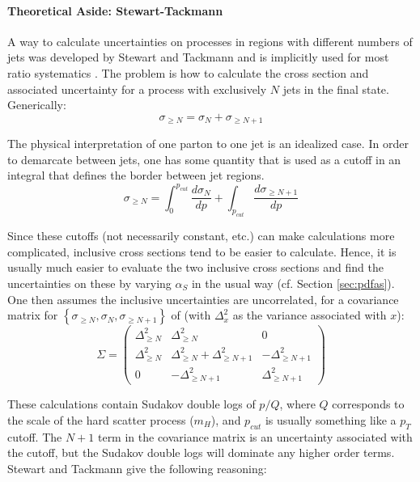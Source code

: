 \paragraph{Theoretical Aside: Stewart-Tackmann}
A way to calculate uncertainties on processes in regions with different numbers of jets was developed by Stewart and Tackmann and is implicitly used for most \nj\, ratio systematics \cite{stewarttackmann}.  The problem is how to calculate the cross section and associated uncertainty for a process with exclusively $N$ jets in the final state.  Generically:
\begin{equation}
\label{eqn:stewtack1}
\sigma_{\ge N}=\sigma_N+\sigma_{\ge N+1}
\end{equation}

The physical interpretation of one parton to one jet is an idealized case.  In order to demarcate between jets, one has some quantity that is used as a cutoff in an integral that defines the border between jet regions.  
\begin{equation}
\label{eqn:stewtack2}
\sigma_{\ge N}=\int_0^{p_{cut}}\frac{d\sigma_N}{dp}+\int_{p_{cut}}\frac{d\sigma_{\ge N+1}}{dp}
\end{equation}

Since these cutoffs (not necessarily constant, etc.) can make calculations more complicated, inclusive cross sections tend to be easier to calculate.  Hence, it is usually much easier to evaluate the two inclusive cross sections and find the uncertainties on these by varying $\alpha_S$ in the usual way (cf. Section \ref{sec:pdfas}).  One then assumes the inclusive uncertainties are uncorrelated, for a covariance matrix for $\left\{\sigma_{\ge N},\sigma_N,\sigma_{\ge N+1}\right\}$ of (with $\Delta_x^2$ as the variance associated with $x$):
\begin{equation}
\label{stewtackcov}
\Sigma=\left(\begin{array}{ccc} \Delta^2_{\ge N} & \Delta^2_{\ge N} &0\\ \Delta^2_{\ge N}& \Delta^2_{\ge N}+\Delta^2_{\ge N+1}& -\Delta^2_{\ge N+1}\\ 0& -\Delta^2_{\ge N+1} & \Delta^2_{\ge N+1} \end{array}\right)
\end{equation}

These calculations contain Sudakov double logs of $p/Q$, where $Q$ corresponds to the scale of the hard scatter process ($m_H$), and $p_{cut}$ is usually something like a $p_T$ cutoff.  The $N+1$ term in the covariance matrix is an uncertainty associated with the cutoff, but the Sudakov double logs will dominate any higher order terms.  Stewart and Tackmann give the following reasoning:

